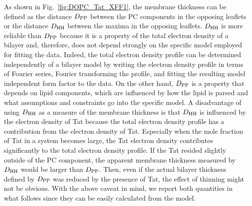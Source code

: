 As shown in Fig.~\ref{fig:DOPC_Tat_XFF1}, the membrane thickness can be defined
as the distance $D_\textrm{PP}$ between the PC components in the opposing leaflets
or the distance $D_\textrm{HH}$ between the maxima in the opposing leaflets. $D_\textrm{HH}$
is more reliable than $D_\textrm{PP}$ because it is a property of the total 
electron density of a bilayer and, therefore, does not depend strongly on the 
specific model employed for fitting the data. Indeed, the total electron
density profile can be determined independently of a bilayer model 
by writing the electron density profile in terms of Fourier series, Fourier transforming
the profile, and fitting the resulting model independent
form factor to the data. On the other hand, $D_\textrm{PP}$ is a property that
depends on lipid components, which are influenced by how the lipid is parsed 
and what assumptions and constraints go into the specific model.
A disadvantage of using $D_\textrm{HH}$ as a measure of the membrane thickness is
that $D_\textrm{HH}$ is influenced by the electron density of Tat because 
the total electron density profile has a contribution from the electron density of Tat. 
Especially when the mole fraction of Tat in a system becomes large, 
the Tat electron density contributes significantly to the total electron 
density profile. If the Tat resided slightly 
outside of the PC component, the apparent membrane thickness measured by $D_\textrm{HH}$
would be larger than $D_\textrm{PP}$. Then, even if the actual bilayer thickness defined by $D_\textrm{PP}$ 
was reduced by the presence of Tat, the effect of thinning might not be obvious. 
With the above caveat in mind, we report both quantities in what follows
since they can be easily calculated from the model.

